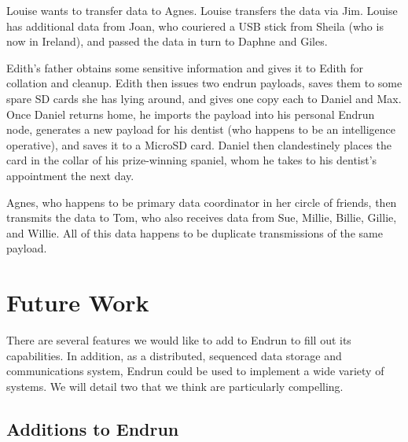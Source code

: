 \documentclass[12pt]{article}
\begin{document}
  Louise wants to transfer data to Agnes. Louise transfers the data via Jim. Louise has additional data from Joan, who couriered a USB stick from Sheila (who is now in Ireland), and passed the data in turn to Daphne and Giles.
  
  Edith's father obtains some sensitive information and gives it to Edith for collation and cleanup. Edith then issues two endrun payloads, saves them to some spare SD cards she has lying around, and gives one copy each to Daniel and Max. Once Daniel returns home, he imports the payload into his personal Endrun node, generates a new payload for his dentist (who happens to be an intelligence operative), and saves it to a MicroSD card. Daniel then clandestinely places the card in the collar of his prize-winning spaniel, whom he takes to his dentist's appointment the next day.
  
  Agnes, who happens to be primary data coordinator in her circle of friends, then transmits the data to Tom, who also receives data from Sue, Millie, Billie, Gillie, and Willie. All of this data happens to be duplicate transmissions of the same payload.
  
  \section{Future Work}
  
  There are several features we would like to add to Endrun to fill out its capabilities. In addition, as a distributed, sequenced data storage and communications system, Endrun could be used to implement a wide variety of systems. We will detail two that we think are particularly compelling.
  
  \subsection{Additions to Endrun}
  
\end{document}
